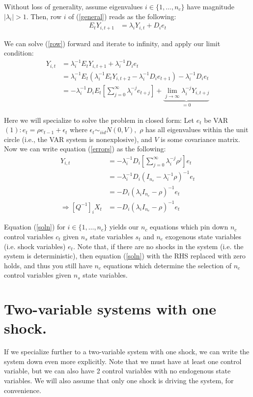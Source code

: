 \documentclass[11pt]{article} %
\begin{document}
Without loss of generality, assume eigenvalues $i \in \{1,\dots, n_c\}$ have magnitude $|\lambda_i|>1$. Then, row $i$ of (\ref{general}) reads as the following:
\begin{align}
E_tY_{i,t+1} &=\lambda_i Y_{i,t} + D_i e_t \label{row}
\end{align}

We can solve (\ref{row}) forward and iterate to infinity, and apply our limit condition:
\begin{align}
Y_{i,t} &= \lambda_i^{-1}E_tY_{i,t+1} + \lambda_i^{-1} D_i e_t \nonumber\\
&= \lambda_i^{-1}E_t(\lambda_i^{-1}E_tY_{i,t+2} - \lambda_i^{-1} D_i e_{t+1}) - \lambda_i^{-1} D_i e_t \nonumber \\
&= - \lambda_i^{-1}D_iE_t\left[ \sum_{j=0}^{\infty}\lambda_i^{-j}e_{t+j}\right] + \underbrace{\lim_{j\rightarrow \infty} \lambda_i^{-j} Y_{i,t+j}}_{=0} \label{errors}
\end{align}

Here we will specialize to solve the problem in closed form: Let $e_t$ be VAR$(1): e_t = \rho e_{t-1} + \epsilon_t$ where $\epsilon_t \sim_{iid} N(0,V),$  $\rho$ has all eigenvalues within the unit circle (i.e., the VAR system is nonexplosive), and $V$ is some covariance matrix. Now we can write equation (\ref{errors}) as the following:
\begin{align}
Y_{i,t} &= -\lambda_i^{-1}D_i\left[ \sum_{j=0}^{\infty}\lambda_i^{-j}\rho^j\right] e_{t} \nonumber\\
&= - \lambda_i^{-1}D_i(I_{n_e} - \lambda_i^{-1}\rho)^{-1}e_t \nonumber \\
&= - D_i(\lambda_i I_{n_e} - \rho)^{-1}e_t \nonumber \\
\Rightarrow [Q^{-1}]_i X_{t} &= - D_i(\lambda_i I_{n_e} - \rho)^{-1}e_t\label{soln}
\end{align}

Equation (\ref{soln}) for $i \in \{1,\dots, n_c\}$ yields our $n_c$ equations which pin down  $n_c$ control variables $c_t$ given $n_s$ state variables $s_t$ and $n_e$ exogenous state variables (i.e. shock variables) $e_t$. Note that, if there are no shocks in the system (i.e. the system is deterministic), then equation (\ref{soln}) with the RHS replaced with zero holds, and thus you still have $n_c$ equations which determine the selection of $n_c$ control variables given $n_s$ state variables.

\section{Two-variable systems with one shock.}
If we specialize further to a two-variable system with one shock, we can write the system down even more explicitly. Note that we must have at least one control variable, but we can also have 2 control variables with no endogenous state variables. We will also assume that only one shock is driving the system, for convenience.
\end{document}

